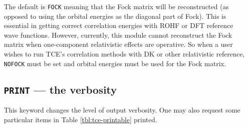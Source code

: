 The default is \verb+FOCK+ meaning that the Fock matrix will
be reconstructed (as opposed to using the orbital energies as the diagonal part of
Fock).  This is essential in getting correct correlation energies with ROHF or DFT
reference wave functions.  However, currently, this module cannot reconstruct the
Fock matrix when one-component relativistic effects are operative.  So when a user
wishes to run TCE's correlation methods with DK or other relativistic reference,
\verb+NOFOCK+ must be set and orbital energies must be used for the Fock matrix.

\subsection{{\tt PRINT} --- the verbosity}

This keyword changes the level of output verbosity.  One may also
request some particular items in Table \ref{tbl:tce-printable} printed.

